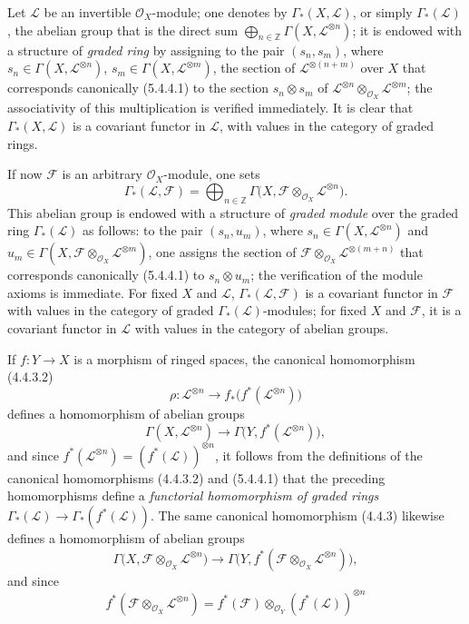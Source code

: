 \begin{env}[5.4.6]
\label{0.5.4.6}
Let $\mathcal{L}$ be an invertible $\mathcal{O}_X$-module; one denotes by
$\Gamma_*(X,\mathcal{L})$, or simply $\Gamma_*(\mathcal{L})$, the abelian
group that is the direct sum
$\bigoplus_{n\in\mathbb{Z}}\Gamma(X,\mathcal{L}^{\otimes n})$; it is endowed
with a structure of \emph{graded ring} by assigning to the pair
$(s_n,s_m)$, where $s_n\in\Gamma(X,\mathcal{L}^{\otimes n})$,
$s_m\in\Gamma(X,\mathcal{L}^{\otimes m})$, the section of
$\mathcal{L}^{\otimes(n+m)}$ over $X$ that corresponds canonically
(5.4.4.1) to the section $s_n\otimes s_m$ of
$\mathcal{L}^{\otimes n}\otimes_{\mathcal{O}_X}\mathcal{L}^{\otimes m}$;
the associativity of this multiplication is verified immediately. It is
clear that $\Gamma_*(X,\mathcal{L})$ is a covariant functor in
$\mathcal{L}$, with values in the category of graded rings.

If now $\mathcal{F}$ is an arbitrary $\mathcal{O}_X$-module, one sets
\[
  \Gamma_*(\mathcal{L},\mathcal{F})
  =\bigoplus_{n\in\mathbb{Z}}
   \Gamma\bigl(X,
     \mathcal{F}\otimes_{\mathcal{O}_X}\mathcal{L}^{\otimes n}\bigr).
\]
This abelian group is endowed with a structure of \emph{graded module} over
the graded ring $\Gamma_*(\mathcal{L})$ as follows: to the pair
$(s_n,u_m)$, where $s_n\in\Gamma(X,\mathcal{L}^{\otimes n})$ and
$u_m\in\Gamma(X,
\mathcal{F}\otimes_{\mathcal{O}_X}\mathcal{L}^{\otimes m})$, one
assigns the section of
$\mathcal{F}\otimes_{\mathcal{O}_X}\mathcal{L}^{\otimes(m+n)}$ that corresponds
canonically (5.4.4.1) to $s_n\otimes u_m$; the verification of the module
axioms is immediate. For fixed $X$ and $\mathcal{L}$,
$\Gamma_*(\mathcal{L},\mathcal{F})$ is a covariant functor in
$\mathcal{F}$ with values in the category of graded
$\Gamma_*(\mathcal{L})$-modules; for fixed $X$ and $\mathcal{F}$,
it is a covariant functor in $\mathcal{L}$ with values in the category of
abelian groups.

If $f:Y\to X$ is a morphism of ringed spaces, the canonical homomorphism
(4.4.3.2)
\[
  \rho:\mathcal{L}^{\otimes n}
  \longrightarrow
  f_*\bigl(f^*(\mathcal{L}^{\otimes n})\bigr)
\]
defines a homomorphism of abelian groups
\[
  \Gamma(X,\mathcal{L}^{\otimes n})
  \longrightarrow
  \Gamma\bigl(Y,f^*(\mathcal{L}^{\otimes n})\bigr),
\]
and since
$f^*(\mathcal{L}^{\otimes n})=(f^*(\mathcal{L}))^{\otimes n}$, it follows from the
definitions of the canonical homomorphisms (4.4.3.2) and (5.4.4.1) that the
preceding homomorphisms define a \emph{functorial homomorphism
of graded rings}
$\Gamma_*(\mathcal{L})\to\Gamma_*(f^*(\mathcal{L}))$. The same canonical
homomorphism (4.4.3) likewise defines a homomorphism of abelian groups
\[
  \Gamma\bigl(X,
    \mathcal{F}\otimes_{\mathcal{O}_X}\mathcal{L}^{\otimes n}\bigr)
  \longrightarrow
  \Gamma\bigl(Y,
    f^*(\mathcal{F}\otimes_{\mathcal{O}_X}\mathcal{L}^{\otimes n})\bigr),
\]
and since
\[
  f^*(\mathcal{F}\otimes_{\mathcal{O}_X}\mathcal{L}^{\otimes n})
  =f^*(\mathcal{F})\otimes_{\mathcal{O}_Y}
   (f^*(\mathcal{L}))^{\otimes n}
  \tag{4.3.3.1}
\]


\end{env}
